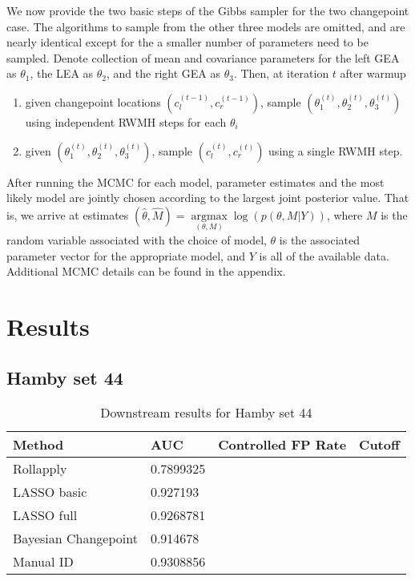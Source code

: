 \documentclass[12pt]{article}
\providecommand{\tightlist}{%
  \setlength{\itemsep}{0pt}\setlength{\parskip}{0pt}}
\begin{document}
We now provide the two basic steps of the Gibbs sampler for the two
changepoint case. The algorithms to sample from the other three models
are omitted, and are nearly identical except for the a smaller number of
parameters need to be sampled. Denote collection of mean and covariance
parameters for the left GEA as \(\theta_1\), the LEA as \(\theta_2\),
and the right GEA as \(\theta_3\). Then, at iteration \(t\) after warmup

\begin{enumerate}
\def\labelenumi{\arabic{enumi}.}
\tightlist
\item
  given changepoint locations \((c_l^{(t - 1)}, c_r^{(t - 1)})\), sample
  \((\theta_1^{(t)}, \theta_2^{(t)}, \theta_3^{(t)})\) using independent
  RWMH steps for each \(\theta_i\)\\
\item
  given \((\theta_1^{(t)}, \theta_2^{(t)}, \theta_3^{(t)})\), sample
  \((c_l^{(t)}, c_r^{(t)})\) using a single RWMH step.
\end{enumerate}

After running the MCMC for each model, parameter estimates and the most
likely model are jointly chosen according to the largest joint posterior
value. That is, we arrive at estimates
\((\hat{\theta}, \hat{M}) = \underset{(\theta, M)}{\operatorname{argmax}}{\log(p(\theta, M | Y))}\),
where \(M\) is the random variable associated with the choice of model,
\(\theta\) is the associated parameter vector for the appropriate model,
and \(Y\) is all of the available data. Additional MCMC details can be
found in the appendix.

\section{Results}

\subsection{Hamby set 44}

\begin{table}[]
\centering
\caption{Downstream results for Hamby set 44}
\begin{tabular}{|l|l|l|l|}
\hline
\textbf{Method} & \textbf{AUC} & \textbf{Controlled FP Rate} & \textbf{Cutoff} \\ \hline
Rollapply & 0.7899325 &  & \\ \hline
LASSO basic & 0.927193 &  &  \\ \hline
LASSO full & 0.9268781 &  &  \\ \hline
Bayesian Changepoint & 0.914678 &  & \\ \hline
Manual ID & 0.9308856 &  & \\ \hline 
\end{tabular}
\end{table}
\end{document}
